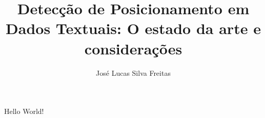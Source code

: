 \documentclass{article}
\author{José Lucas Silva Freitas}
\title{Detecção de Posicionamento em Dados Textuais:
 O estado da arte e considerações}
\begin{document}
\maketitle
    Hello World!
\end{document}
